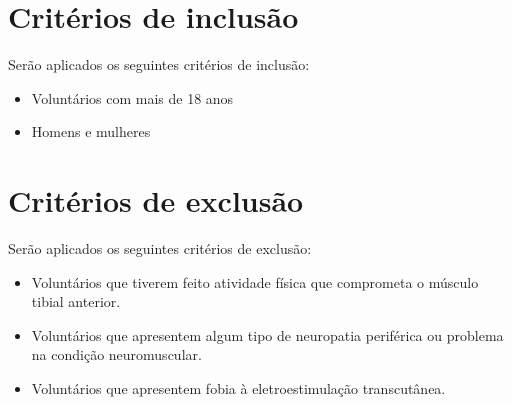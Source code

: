 \section{Critérios de inclusão}

Serão aplicados os seguintes critérios de inclusão:

\begin{itemize}
  \item Voluntários com mais de 18 anos
  \item Homens e mulheres  
\end{itemize}

\section{Critérios de exclusão}

Serão aplicados os seguintes critérios de exclusão:

\begin{itemize}
  \item Voluntários que tiverem feito atividade física que comprometa o músculo tibial anterior.
  \item Voluntários que apresentem algum tipo de neuropatia periférica ou problema na condição neuromuscular.
  \item Voluntários que apresentem fobia à eletroestimulação transcutânea.
\end{itemize}